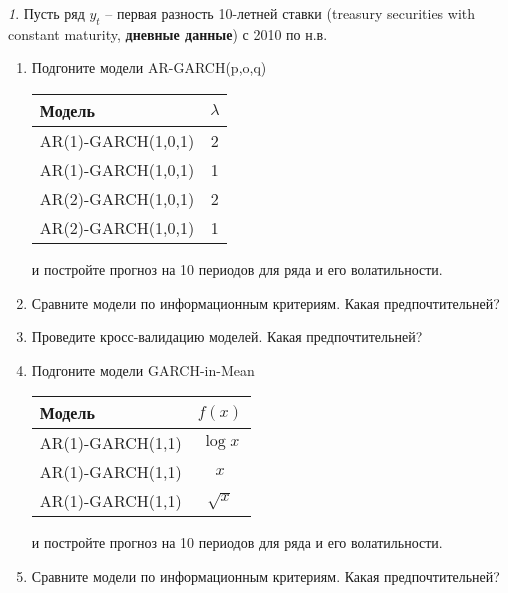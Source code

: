 \documentclass[12pt]{article}
\theoremstyle{remark}
\newtheorem{exercise}{}[subsection]
\begin{document}
\begin{exercise}
Пусть ряд \(y_t\) -- первая разность 10-летней ставки (treasury securities  with constant maturity, \textbf{дневные данные}) с 2010 по н.в.
\begin{enumerate}
	\item Подгоните модели AR-GARCH(p,o,q)
	\begin{center}
	\begin{tabular}{l|c}
		Модель & \(\lambda\) \\ \hline
		AR(1)-GARCH(1,0,1) & 2 \\
		AR(1)-GARCH(1,0,1) & 1 \\
		AR(2)-GARCH(1,0,1) & 2 \\
		AR(2)-GARCH(1,0,1) & 1 \\ \hline
	\end{tabular}
	\end{center} 
	и постройте прогноз на 10 периодов для ряда и его волатильности.
	\item Сравните модели по информационным критериям. Какая предпочтительней?
	\item Проведите кросс-валидацию моделей. Какая предпочтительней?
	\item Подгоните модели GARCH-in-Mean
	\begin{center}
		\begin{tabular}{l|c}
			Модель & \(f(x)\) \\ \hline
			AR(1)-GARCH(1,1) & \(\log x\) \\
			AR(1)-GARCH(1,1) & \(x\) \\
			AR(1)-GARCH(1,1) & \(\sqrt{x}\) \\
		\end{tabular}
	\end{center} 
	и постройте прогноз на 10 периодов для ряда и его волатильности.
	\item Сравните модели по информационным критериям. Какая предпочтительней?
\end{enumerate}
\end{exercise}
\end{document}
